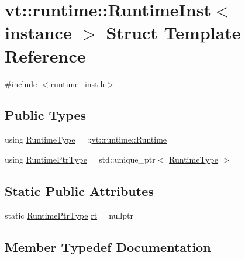 \hypertarget{structvt_1_1runtime_1_1_runtime_inst}{}\section{vt\+:\+:runtime\+:\+:Runtime\+Inst$<$ instance $>$ Struct Template Reference}
\label{structvt_1_1runtime_1_1_runtime_inst}


{\ttfamily \#include $<$runtime\+\_\+inst.\+h$>$}

\subsection*{Public Types}
\begin{DoxyCompactItemize}
\item 
using \hyperlink{structvt_1_1runtime_1_1_runtime_inst_a60483df7bc2ed636e7838961c7c6c28a}{Runtime\+Type} = \+::\hyperlink{structvt_1_1runtime_1_1_runtime}{vt\+::runtime\+::\+Runtime}
\item 
using \hyperlink{structvt_1_1runtime_1_1_runtime_inst_aebff925fed3f868dfab2dc86089d80c9}{Runtime\+Ptr\+Type} = std\+::unique\+\_\+ptr$<$ \hyperlink{structvt_1_1runtime_1_1_runtime_inst_a60483df7bc2ed636e7838961c7c6c28a}{Runtime\+Type} $>$
\end{DoxyCompactItemize}
\subsection*{Static Public Attributes}
\begin{DoxyCompactItemize}
\item 
static \hyperlink{structvt_1_1runtime_1_1_runtime_inst_aebff925fed3f868dfab2dc86089d80c9}{Runtime\+Ptr\+Type} \hyperlink{structvt_1_1runtime_1_1_runtime_inst_a19ed3095efba69b6ab453eb9129eafd0}{rt} = nullptr
\end{DoxyCompactItemize}


\subsection{Member Typedef Documentation}
\mbox{\label{structvt_1_1runtime_1_1_runtime_inst_aebff925fed3f868dfab2dc86089d80c9}} 
